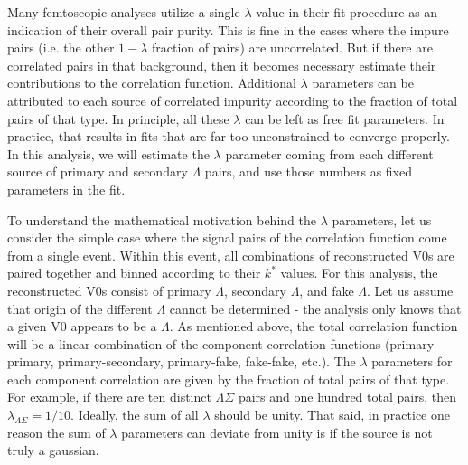 Many femtoscopic analyses utilize a single $\lambda$ value in their fit procedure as an indication of their overall pair purity.  
This is fine in the cases where the impure pairs (i.e. the other $1 - \lambda$ fraction of pairs) are uncorrelated.
But if there are correlated pairs in that background, then it becomes necessary estimate their contributions to the correlation function.
Additional $\lambda$ parameters can be attributed to each source of correlated impurity according to the fraction of total pairs of that type.
In principle, all these $\lambda$ can be left as free fit parameters.
In practice, that results in fits that are far too unconstrained to converge properly.
In this analysis, we will estimate the $\lambda$ parameter coming from each different source of primary and secondary $\Lambda$ pairs, and use those numbers as fixed parameters in the fit.


To understand the mathematical motivation behind the $\lambda$ parameters, let us consider the simple case where the signal pairs of the correlation function come from a single event.  
Within this event, all combinations of reconstructed V0s are paired together and binned according to their $k^*$ values.  
For this analysis, the reconstructed V0s consist of primary $\Lambda$, secondary $\Lambda$, and fake $\Lambda$.  
Let us assume that origin of the different $\Lambda$ cannot be determined - the analysis only knows that a given V0 appears to be a $\Lambda$.  
As mentioned above, the total correlation function will be a linear combination of the component correlation functions (primary-primary, primary-secondary, primary-fake, fake-fake, etc.).  
The $\lambda$ parameters for each component correlation are given by the fraction of total pairs of that type.  
For example, if there are ten distinct $\Lambda\Sigma$ pairs and one hundred total pairs, then $\lambda_{\Lambda\Sigma} = 1/10$.  
Ideally, the sum of all $\lambda$ should be unity.  
That said, in practice one reason the sum of $\lambda$ parameters can deviate from unity is if the source is not truly a gaussian.

